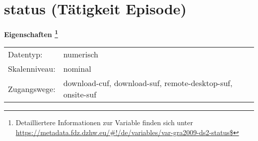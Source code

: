 
    \setcounter{footnote}{0}

    \vspace*{-1.8cm}
	\section{status (Tätigkeit Episode)}
	\label{section:status}



    \vspace*{0.5cm}
    \noindent\textbf{Eigenschaften
	\footnote{Detailliertere Informationen zur Variable finden sich unter
		\url{https://metadata.fdz.dzhw.eu/\#!/de/variables/var-gra2009-ds2-status$}}}\\
	\begin{tabularx}{\hsize}{@{}lX}
	Datentyp: & numerisch \\
	Skalenniveau: & nominal \\
	Zugangswege: &
	  download-cuf, 
	  download-suf, 
	  remote-desktop-suf, 
	  onsite-suf
 \\
    \end{tabularx}



